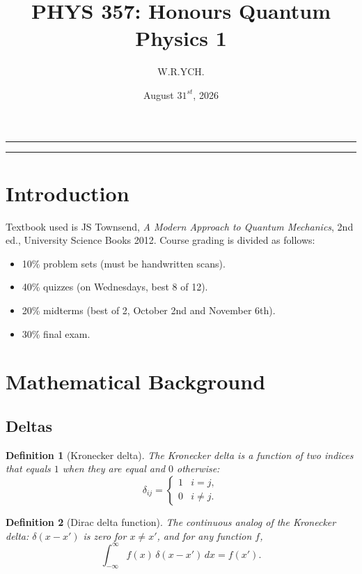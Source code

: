 \documentclass{article}
\newtheorem{definition}{Definition}
\begin{document}
\title{PHYS 357: Honours Quantum Physics 1}
\author{W.R.YCH.}
\date{August \(31^{st}\), 2026}
\setcounter{Maxaffil}{0}
\renewcommand\Affilfont{\itshape\small}
\maketitle
\noindent\rule{\textwidth}{0.4pt}
\thispagestyle{empty}
\begin{abstract}
\end{abstract}
\noindent\rule{\textwidth}{0.4pt}
\clearpage
\pagestyle{empty}
{
  \hypersetup{linkcolor=black}
  \tableofcontents
}
\clearpage
\pagestyle{plain}
\setcounter{page}{1}


\section{Introduction}
Textbook used is JS Townsend, \emph{A Modern Approach to Quantum Mechanics}, 2nd ed., University Science Books 2012. Course grading is divided as follows:
\begin{itemize}
    \item 10\% problem sets (must be handwritten scans).
    \item 40\% quizzes (on Wednesdays, best 8 of 12).
    \item 20\% midterms (best of 2, October 2nd and November 6th).
    \item 30\% final exam.
\end{itemize}


\section{Mathematical Background}

\subsection{Deltas}
\begin{definition}[Kronecker delta]
    The Kronecker delta is a function of two indices that equals $1$ when they are equal and $0$ otherwise:
    \begin{equation}
        \delta_{ij} = \begin{cases} 1 & i = j, \\ 0 & i \neq j. \end{cases}
    \end{equation}
\end{definition}
\begin{definition}[Dirac delta function]
    The continuous analog of the Kronecker delta: $\delta(x - x')$ is zero for $x \neq x'$, and for any function $f$,
    \begin{equation}
        \int_{-\infty}^{\infty} f(x)\,\delta(x - x')\,dx = f(x').
    \end{equation}
\end{definition}
\end{document}

